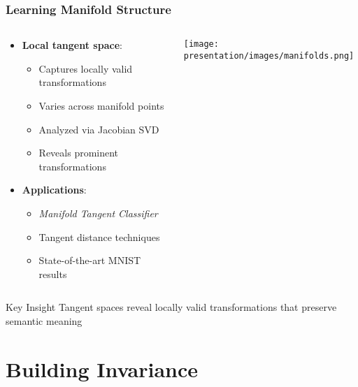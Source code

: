 \documentclass{beamer}
\begin{document}
\begin{frame}
\frametitle{Learning Manifold Structure}
\begin{columns}
    \begin{column}{0.57\textwidth}
        \begin{itemize}
        \item \textbf{Local tangent space}:
            \begin{itemize}
            \item Captures locally valid transformations
            \item Varies across manifold points
            \item Analyzed via Jacobian SVD
            \item Reveals prominent transformations
            \end{itemize}
        \pause

        \item \textbf{Applications}:
            \begin{itemize}
            \item \textit{Manifold Tangent Classifier}
            \item Tangent distance techniques
            \item State-of-the-art MNIST results
            \end{itemize}
        \end{itemize}
    \end{column}
    \pause

    \begin{column}{0.45\textwidth}
        \texttt{[image: presentation/images/manifolds.png]}
    \end{column}
\end{columns}

\begin{alertblock}{Key Insight}
Tangent spaces reveal locally valid transformations that preserve semantic meaning
\end{alertblock}
\end{frame}

\section{Building Invariance}
\end{document}
